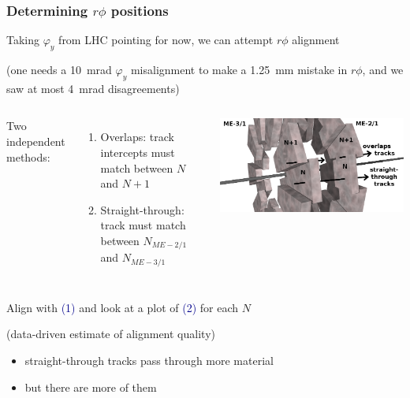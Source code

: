 \documentclass[compress]{beamer}
\begin{document}
\begin{frame}
\frametitle{Determining $r\phi$ positions}
\small

Taking $\varphi_y$ from LHC pointing for now, we can attempt $r\phi$ alignment

\vspace{0.2 cm}
{\scriptsize (one needs a 10~mrad $\varphi_y$ misalignment to make a 1.25~mm mistake in $r\phi$, and we saw at most 4~mrad disagreements)}

\vfill
\begin{columns}
Two independent methods:
\begin{enumerate}
\item Overlaps: track intercepts must match between $N$ and $N+1$
\item Straight-through: track must match between $N_{ME-2/1}$ and $N_{ME-3/1}$
\end{enumerate}

\includegraphics[width=\linewidth]{overlaps_straight_through.png}
\end{columns}

\vfill
Align with \textcolor{darkblue}{(1)} and look at a plot of \textcolor{darkblue}{(2)} for each $N$

(data-driven estimate of alignment quality)

\begin{itemize}
\item straight-through tracks pass through more material
\item but there are more of them
\end{itemize}
\end{frame}
\end{document}
